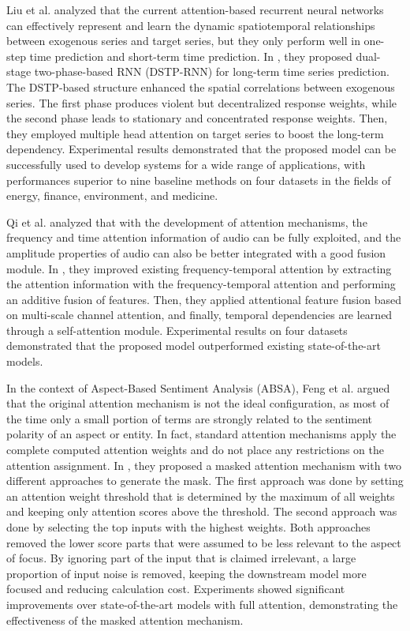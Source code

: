 Liu et al. analyzed that the current attention-based recurrent neural networks can effectively represent and learn the dynamic spatiotemporal relationships between exogenous series and target series, but they only perform well in one-step time prediction and short-term time prediction.
In \cite{LIU2020113082}, they proposed dual-stage two-phase-based RNN (DSTP-RNN) for long-term time series prediction.
The DSTP-based structure enhanced the spatial correlations between exogenous series.
The first phase produces violent but decentralized response weights, while the second phase leads to stationary and concentrated response weights.
Then, they employed multiple head attention on target series to boost the long-term dependency.
Experimental results demonstrated that the proposed model can be successfully used to develop systems for a wide range of applications, with performances superior to nine baseline methods on four datasets in the fields of energy, finance, environment, and medicine.

Qi et al. analyzed that with the development of attention mechanisms, the frequency and time attention information of audio can be fully exploited, and the amplitude properties of audio can also be better integrated with a good fusion module.
In \cite{10019616}, they improved existing frequency-temporal attention by extracting the attention information with the frequency-temporal attention and performing an additive fusion of features.
Then, they applied attentional feature fusion based on multi-scale channel attention, and finally, temporal dependencies are learned through a self-attention module.
Experimental results on four datasets demonstrated that the proposed model outperformed existing state-of-the-art models.

In the context of Aspect-Based Sentiment Analysis (ABSA), Feng et al. argued that the original attention mechanism is not the ideal configuration, as most of the time only a small portion of terms are strongly related to the sentiment polarity of an aspect or entity.
In fact, standard attention mechanisms apply the complete computed attention weights and do not place any restrictions on the attention assignment.
In \cite{9676694}, they proposed a masked attention mechanism with two different approaches to generate the mask.
The first approach was done by setting an attention weight threshold that is determined by the maximum of all weights and keeping only attention scores above the threshold.
The second approach was done by selecting the top inputs with the highest weights.
Both approaches removed the lower score parts that were assumed to be less relevant to the aspect of focus.
By ignoring part of the input that is claimed irrelevant, a large proportion of input noise is removed, keeping the downstream model more focused and reducing calculation cost.
Experiments showed significant improvements over state-of-the-art models with full attention, demonstrating the effectiveness of the masked attention mechanism.

